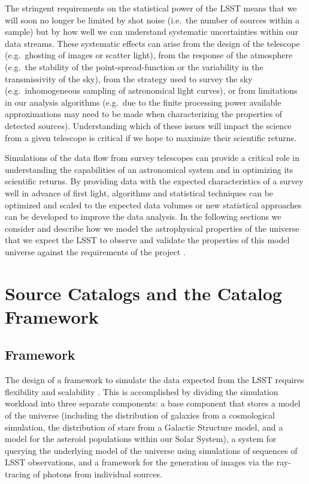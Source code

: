 \documentclass[11pt]{article}
\begin{document}
The stringent requirements on the statistical power of the LSST means
that we will soon no longer be limited by shot noise (i.e.\ the number
of sources within a sample) but by how well we can understand
systematic uncertainties within our data streams. These systematic
effects can arise from the design of the telescope (e.g.\ ghosting of
images or scatter light), from the response of the atmosphere (e.g.\
the stability of the point-spread-function or the variability in the
transmissivity of the sky), from the strategy used to survey the sky
(e.g.\ inhomogeneous sampling of astronomical light curves), or from
limitations in our analysis algorithms (e.g.\ due to the finite
processing power available approximations may need to be made when
characterizing the properties of detected sources). Understanding
which of these issues will impact the science from a given telescope
is critical if we hope to maximize their scientific returns.

Simulations of the data flow from survey telescopes can provide a
critical role in understanding the capabilities of an astronomical
system and in optimizing its scientific returns. By providing data
with the expected characteristics of a survey well in advance of first
light, algorithms and statistical techniques can be optimized and
scaled to the expected data volumes or new statistical approaches can
be developed to improve the data analysis.  In the following sections
we consider and describe how we model the astrophysical properties of
the universe that we expect the LSST to observe and validate the
properties of this model universe against the requirements of the
project \citep{requirements}.

\section{Source Catalogs and the Catalog Framework}

\subsection{Framework}

The design of a framework to simulate the data expected from the LSST
requires flexibility and scalability \citep{connolly10}.
This is accomplished by dividing the simulation workload into three
separate components: a base component that stores a model of the
universe (including the distribution of galaxies from a cosmological
simulation, the distribution of stars from a Galactic Structure model,
and a model for the asteroid populations within our Solar System), a
system for querying the underlying model of the universe using
simulations of sequences of LSST observations, and a framework for the
generation of images via the ray-tracing of photons from individual
sources.
\end{document}
